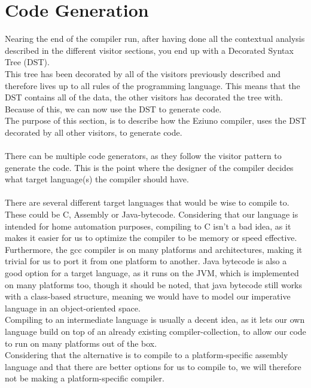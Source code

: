 \section{Code Generation}
Nearing the end of the compiler run, after having done all the contextual analysis described in the different visitor sections, you end up with a Decorated Syntax Tree (DST).\\
This tree has been decorated by all of the visitors previously described and therefore lives up to all rules of the programming language. This means that the DST contains all of the data, the other visitors has decorated the tree with. Because of this, we can now use the DST to generate code.\\
The purpose of this section, is to describe how the Eziuno compiler, uses the DST decorated by all other visitors, to generate code.
\\\\
There can be multiple code generators, as they follow the visitor pattern to generate the code. This is the point where the designer of the compiler decides what target language(s) the compiler should have.
\\\\
There are several different target languages that would be wise to compile to. These could be C, Assembly or Java-bytecode. Considering that our language is intended for home automation purposes, compiling to C isn't a bad idea, as it makes it easier for us to optimize the compiler to be memory or speed effective.\\
Furthermore, the gcc compiler is on many platforms and architectures, making it trivial for us to port it from one platform to another. Java bytecode is also a good option for a target language, as it runs on the JVM, which is implemented on many platforms too, though it should be noted, that java bytecode still works with a class-based structure, meaning we would have to model our imperative language in an object-oriented space.\\
Compiling to an intermediate language is usually a decent idea, as it lets our own language build on top of an already existing compiler-collection, to allow our code to run on many platforms out of the box.\\
Considering that the alternative is to compile to a platform-specific assembly language and that there are better options for us to compile to, we will therefore not be making a platform-specific compiler.
\\\\
